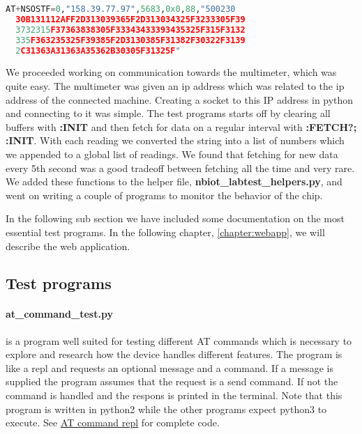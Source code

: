 \documentclass[USenglish]{ifimaster}  %
\begin{document}
\begin{lstlisting}[caption={\acrshort{nb-iot} sample transmit},label={samplecommand},language=Python]
  AT+NSOSTF=0,"158.39.77.97",5683,0x0,88,"500230
  30B131112AFF2D313039365F2D313034325F3233305F39
  3732315F37363838305F33343433393435325F315F3132
  335F363235325F39385F2D3130385F31382F30322F3139
  2C31363A31363A35362B30305F31325F"
\end{lstlisting}

We proceeded working on communication towards the multimeter, which was quite easy. The multimeter was given an \acrshort{ip} address which was related to the \acrshort{ip} address of the connected machine. Creating a socket to this IP address in python and connecting to it was simple. The test programs starts off by clearing all buffers with \textbf{:INIT} and then fetch for data on a regular interval with \textbf{:FETCH?; :INIT}. With each reading we converted the string into a list of numbers which we appended to a global list of readings. We found that fetching for new data every 5th second was a good tradeoff between fetching all the time and very rare. We added these functions to the helper file, \textbf{nbiot\_labtest\_helpers.py}, and went on writing a couple of programs to monitor the behavior of the chip.

In the following sub section we have included some documentation on the most essential test programs. In the following chapter, \vref{chapter:webapp}, we will describe the web application.

\subsection{Test programs}
\paragraph{\textbf{at\_command\_test.py}} is a program well suited for testing different AT commands which is necessary to explore and research how the device handles different features. The program is like a \acrshort{repl} and requests an optional message and a command. If a message is supplied the program assumes that the request is a send command. If not the command is handled and the respons is printed in the terminal. Note that this program is written in python2 while the other programs expect python3 to execute. See \href{https://github.com/henninghaakonsen/thesis/blob/master/code/at_command_test.py}{AT command \acrshort{repl}}\cite{code:atcommand} for complete code.
\end{document}
